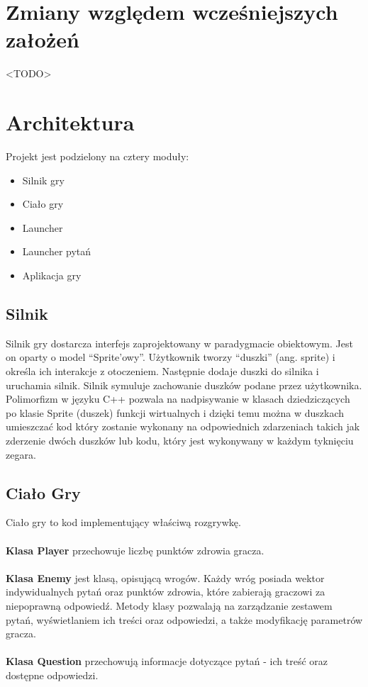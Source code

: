 \documentclass[12pt, titlepage]{article}
\begin{document}
\section{Zmiany względem wcześniejszych założeń}
<TODO>



\section{Architektura}
Projekt jest podzielony na cztery moduły:
\begin{itemize}
	\item Silnik gry
	\item Ciało gry
	\item Launcher
        \item Launcher pytań
	\item Aplikacja gry
\end{itemize}

\subsection{Silnik}
Silnik gry dostarcza interfejs zaprojektowany w
paradygmacie obiektowym. Jest on oparty o model
"`Sprite'owy"'. Użytkownik tworzy "`duszki"' (ang.
sprite) i określa ich interakcje z otoczeniem.
Następnie dodaje duszki do silnika i uruchamia
silnik. Silnik symuluje zachowanie duszków
podane przez użytkownika. Polimorfizm w języku C++
pozwala na
nadpisywanie w klasach dziedziczących po klasie
Sprite (duszek) funkcji wirtualnych i dzięki temu
można w duszkach umieszczać kod który zostanie
wykonany na odpowiednich zdarzeniach takich jak
zderzenie dwóch duszków lub kodu, który jest
wykonywany w każdym tyknięciu zegara.

\subsection{Ciało Gry}
Ciało gry to kod implementujący właściwą
rozgrywkę.
\\~\\
\textbf{Klasa Player} przechowuje
liczbę punktów zdrowia gracza.
\\~\\
\textbf{Klasa Enemy} jest klasą, opisującą wrogów. Każdy wróg posiada 
wektor indywidualnych pytań oraz punktów zdrowia, które zabierają graczowi za niepoprawną
odpowiedź. Metody klasy
pozwalają na zarządzanie zestawem pytań, wyświetlaniem ich treści oraz odpowiedzi, a także 
modyfikację parametrów gracza.
\\~\\
\textbf{Klasa Question} przechowują informacje dotyczące pytań - ich treść oraz dostępne odpowiedzi.
\end{document}
